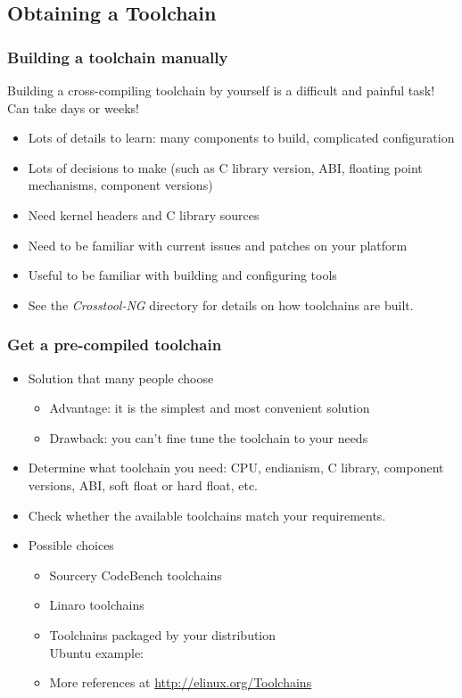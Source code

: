 \subsection{Obtaining a Toolchain}

\begin{frame}
  \frametitle{Building a toolchain manually}

  Building a cross-compiling toolchain by yourself is a difficult and painful
  task! Can take days or weeks!
  \begin{itemize}
  \item Lots of details to learn: many components to build, complicated
    configuration
  \item Lots of decisions to make (such as C library version, ABI, floating point
    mechanisms, component versions)
  \item Need kernel headers and C library sources
  \item Need to be familiar with current  issues and patches
    on your platform
  \item Useful to be familiar with building and configuring tools
  \item See the {\em Crosstool-NG}  directory for details
    on how toolchains are built.
\end{itemize}
\end{frame}

\begin{frame}
  \frametitle{Get a pre-compiled toolchain}
  \begin{itemize}
  \item Solution that many people choose
    \begin{itemize}
    \item Advantage: it is the simplest and most convenient solution
    \item Drawback: you can't fine tune the toolchain to your needs
    \end{itemize}
  \item Determine what toolchain you need: CPU, endianism, C library, component
    versions, ABI, soft float or hard float, etc.
  \item Check whether the available toolchains match your requirements.
  \item Possible choices
    \begin{itemize}
    \item Sourcery CodeBench toolchains
    \item Linaro toolchains
    \item Toolchains packaged by your distribution\\
	  Ubuntu example: 
    \item More references at \url{http://elinux.org/Toolchains}
    \end{itemize}
  \end{itemize}
\end{frame}

